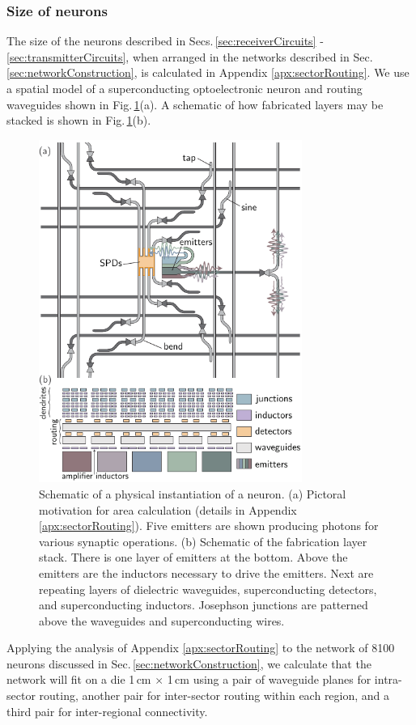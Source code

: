 \documentclass[aip,amsmath,amssymb,reprint,nofootinbib]{revtex4-1}
\begin{document}
\subsubsection{\label{sec:sizeOfNeurons}Size of neurons} 
The size of the neurons described in Secs.\,\ref{sec:receiverCircuits} - \ref{sec:transmitterCircuits}, when arranged in the networks described in Sec.\,\ref{sec:networkConstruction}, is calculated in Appendix \ref{apx:sectorRouting}. We use a spatial model of a superconducting optoelectronic neuron and routing waveguides shown in Fig.\,\ref{fig:networks_areaDiagram}(a). A schematic of how fabricated layers may be stacked is shown in Fig.\,\ref{fig:networks_areaDiagram}(b). 
\begin{figure}[t!]
	\centerline{\includegraphics[width=8.6cm]{_networks_areaDiagram_small.pdf}}
	\caption{\label{fig:networks_areaDiagram}Schematic of a physical instantiation of a neuron. (a) Pictoral motivation for area calculation (details in Appendix \ref{apx:sectorRouting}). Five emitters are shown producing photons for various synaptic operations. (b) Schematic of the fabrication layer stack. There is one layer of emitters at the bottom. Above the emitters are the inductors necessary to drive the emitters. Next are repeating layers of dielectric waveguides, superconducting detectors, and superconducting inductors. Josephson junctions are patterned above the waveguides and superconducting wires.}
\end{figure} 
Applying the analysis of Appendix \ref{apx:sectorRouting} to the network of 8100 neurons discussed in Sec.\,\ref{sec:networkConstruction}, we calculate that the network will fit on a die 1\,cm $\times$ 1\,cm using a pair of waveguide planes for intra-sector routing, another pair for inter-sector routing within each region, and a third pair for inter-regional connectivity. 
\end{document}
